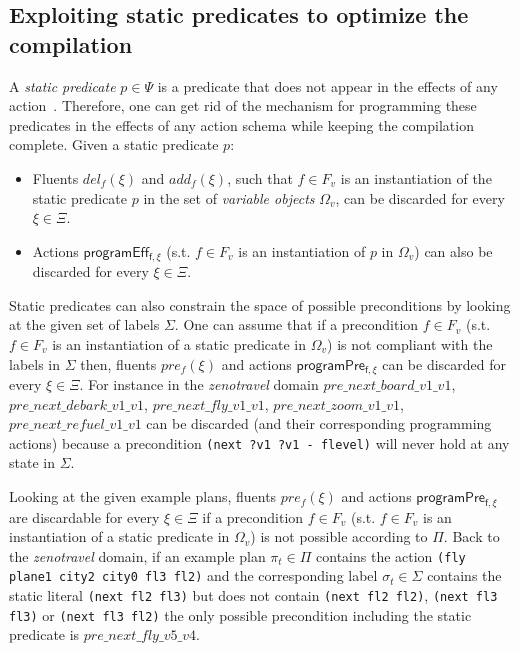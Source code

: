 \documentclass[3p,times]{elsarticle}
\begin{document}
\subsection{Exploiting static predicates to optimize the compilation}
A {\em static predicate} $p \in \Psi$ is a predicate that does not appear in the effects of any action~\cite{fox:TIM:JAIR1998}. Therefore, one can get rid of the mechanism for programming these predicates in the effects of any action schema while keeping the compilation complete. Given a static predicate $p$:
\begin{itemize}
\item Fluents $del_f(\xi)$ and $add_f(\xi)$, such that $f\in F_v$ is an instantiation of the static predicate $p$ in the set of {\em variable objects} $\Omega_v$, can be discarded for every $\xi\in\Xi$.
\item Actions $\mathsf{programEff_{f,\xi}}$ (s.t. $f\in F_v$ is an instantiation of $p$ in $\Omega_v$) can also be discarded for every $\xi\in\Xi$.
\end{itemize}

Static predicates can also constrain the space of possible preconditions by looking at the given set of labels $\Sigma$. One can assume that if a precondition $f\in F_v$ (s.t. $f\in F_v$ is an instantiation of a static predicate in $\Omega_v$) is not compliant with the labels in $\Sigma$ then, fluents $pre_f(\xi)$ and actions $\mathsf{programPre_{f,\xi}}$ can be discarded for every $\xi\in\Xi$. For instance in the {\em zenotravel} domain $pre\_next\_board\_v1\_v1$, $pre\_next\_debark\_v1\_v1$, $pre\_next\_fly\_v1\_v1$, $pre\_next\_zoom\_v1\_v1$, $pre\_next\_refuel\_v1\_v1$ can be discarded (and their corresponding programming actions) because a precondition {\tt\small(next ?v1 ?v1 - flevel)} will never hold at any state in $\Sigma$.

Looking at the given example plans, fluents $pre_f(\xi)$ and actions $\mathsf{programPre_{f,\xi}}$ are discardable for every $\xi\in\Xi$ if a precondition $f\in F_v$ (s.t. $f\in F_v$ is an instantiation of a static predicate in $\Omega_v$) is not possible according to $\Pi$. Back to the {\em zenotravel} domain, if an example plan $\pi_t\in \Pi$ contains the action {\tt\small (fly plane1 city2 city0 fl3 fl2)} and the corresponding label $\sigma_t\in\Sigma$ contains the static literal {\tt\small (next fl2 fl3)} but does not contain {\tt\small (next fl2 fl2)}, {\tt\small (next fl3 fl3)} or {\tt\small (next fl3 fl2)} the only possible precondition including the static predicate is $pre\_next\_fly\_v5\_v4$.
\end{document}
